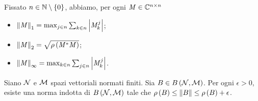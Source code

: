 \begin{Theorem}
  Fissato $n \in \mathbb{N} \setminus \lbrace 0 \rbrace$, abbiamo, per ogni
  $\mathit{M} \in \mathbb{C}^{n \times n}$
  \begin{itemize}
    \item $\Norm{\Matrix}[1]
      = \max_{j \in n} \sum_{k \in n} \AbsoluteValue{\Matrix_k^j}$;
    \item $\Norm{\Matrix}[2]
      = \sqrt{\SpectralRadius{\HermitianTransposed{\Matrix}\Matrix}}$;
    \item $\Norm{\Matrix}[\infty]
      = \max_{k \in n} \sum_{j \in n} \AbsoluteValue{\Matrix_k^j}$.
  \end{itemize}
\end{Theorem}
\begin{Theorem}
	Siano $\mathcal{N}$ e $\mathcal{M}$ spazi vettoriali normati finiti. Sia $B \in B \left ( \mathcal{N} , \mathcal{M} \right )$. Per ogni $\epsilon > 0$, esiste una norma indotta di $B \left ( \mathcal{N} , \mathcal{M} \right )$ tale che $\SpectralRadius{\BoundedLinearOperator} \leq \Norm{\BoundedLinearOperator} \leq \SpectralRadius{\BoundedLinearOperator} + \epsilon$.
\end{Theorem}
